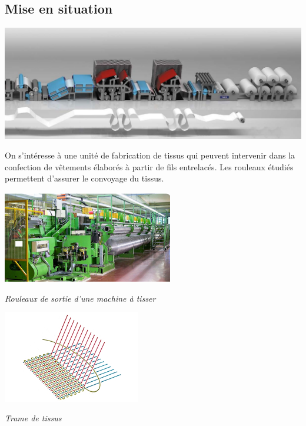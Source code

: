 \documentclass[10pt]{article}
\begin{document}

 \renewcommand{\baselinestretch}{1.2}
\setlength{\parskip}{0ex plus 0.5ex minus 0.2ex}


\subsection*{Mise en situation}
\begin{center}
\includegraphics[width=.7\textwidth]{images/Rouleaux}
\end{center}


On s'intéresse à une unité de fabrication de tissus qui peuvent intervenir dans la confection de vêtements élaborés à partir de fils entrelacés. Les rouleaux étudiés permettent d’assurer le convoyage du tissus. 


\vspace{.25cm}

\begin{minipage}[c]{.47\linewidth}
\begin{center}
\includegraphics[height=4cm]{images/Rouleaux2}

\textit{Rouleaux de sortie d'une machine à tisser}
\end{center}
\end{minipage} \hfill
\begin{minipage}[c]{.47\linewidth}
\begin{center}
\includegraphics[height=4cm]{images/trame}

\textit{Trame de tissus}
\end{center}
\end{minipage}
\vspace{.25cm}
\end{document}
